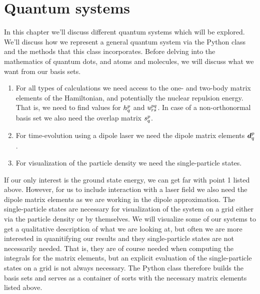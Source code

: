 \chapter{Quantum systems}
    In this chapter we'll discuss different quantum systems which will be
    explored.
    We'll discuss how we represent a general quantum system via the Python class
     and the methods that this class incorporates.
    Before delving into the mathematics of quantum dots, and atoms and
    molecules, we will discuss what we want from our basis sets.
    \begin{enumerate}
        \item For all types of calculations we need access to the one- and
            two-body matrix elements of the Hamiltonian, and potentially the
            nuclear repulsion energy.
            That is, we need to find values for $h^{p}_{q}$ and
            $u^{pq}_{rs}$.
            In case of a non-orthonormal basis set we also need the overlap
            matrix $s^{p}_{q}$.
        \item For time-evolution using a dipole laser we need the dipole matrix
            elements $\boldsymbol{d}^{p}_{q}$.
        \item For visualization of the particle density we need the
            single-particle states.
    \end{enumerate}
    If our only interest is the ground state energy, we can get far with point 1
    listed above.
    However, for us to include interaction with a laser field we also need the
    dipole matrix elements as we are working in the dipole approximation.
    The single-particle states are necessary for visualization of the system on
    a grid either via the particle density or by themselves.
    We will visualize some of our systems to get a qualitative description of
    what we are looking at, but often we are more interested in quanitifying our
    results and they single-particle states are not necessarily needed.
    That is, they are of course needed when computing the integrals for the
    matrix elements, but an explicit evaluation of the single-particle states on
    a grid is not always necessary.
    The Python class  therefore builds the basis sets and
    serves as a container of sorts with the necessary matrix elements listed
    above.

